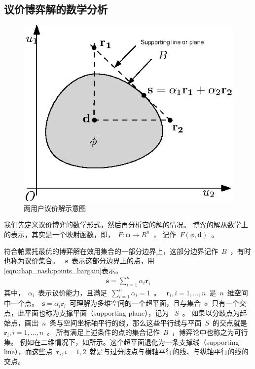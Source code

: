 \subsection{议价博弈解的数学分析}
\begin{figure}[!tb] 
    \centering
   \begin{minipage}[t]{0.5\linewidth} 
    \centering 
    \includegraphics[width = \textwidth]{chap_nash_2_dim_nash_bargain.eps} 
    \caption{两用户议价解示意图} 
    \label{fig:chap_bargain:2_dim_nash_bargain} 
  \end{minipage}%
\end{figure}

我们先定义议价博弈的数学形式，然后再分析它的解的情况。
博弈的解从数学上的表示，其实是一个映射函数，即，~$F: \mathbf{\phi} \rightarrow R^n$~，
记作~$F(\phi, \mathbf{d})$~。

符合帕累托最优的博弈解在效用集合的一部分边界上，这部分边界记作~$B$~，有时也称为议价集合。
~$\mathbf{s}$~表示这部分边界上的点，用 \eqref{eqn:chap_nash:points_bargain}表示。
\begin{align}
 \mathbf{s} = \sum_{i=1}^n \alpha_i \mathbf{r}_i
    \label{eqn:chap_nash:points_bargain}
\end{align}
其中，~$\alpha_i$~表示议价能力，且满足~$\sum_{i=1}^n \alpha_i = 1$~。
~$\mathbf{r}_i, i= 1,\dots,n$~是~$n$~维空间中一个点。~$\mathbf{s} = \alpha_i \mathbf{r}_i$~可理解为多维空间的一个超平面，且与集合~$\phi$~只有一个交点，此平面也称为支撑平面（supporting plane），记为 ~$S$~。
如果以分歧点为起始点，画出~$n$~条与空间坐标轴平行的线，那么这些平行线与平面~$S$~的交点就是~$\mathbf{r}_i, i= 1,\dots,n$~。
所有满足上述条件的点的集合记作~$B$~，博弈论中也称之为可行集。
例如在二维情况下，如所示。这个超平面退化为一条支撑线（supporting line），而这些点~$\mathbf{r}_i, i= 1,2$~就是与过分歧点与横轴平行的线、与纵轴平行的线的交点。

